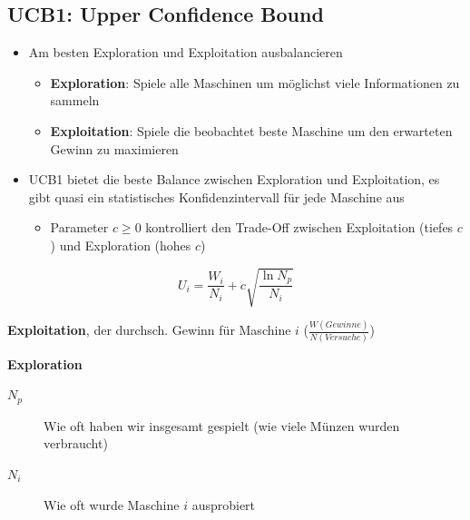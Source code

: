 \documentclass[a4paper]{article}
\begin{document}
		\subsection{UCB1: Upper Confidence Bound}
		
		\begin{itemize}
			\item Am besten Exploration und Exploitation ausbalancieren
				\begin{itemize}
					\item \textbf{Exploration}: Spiele alle Maschinen um möglichst viele Informationen zu sammeln
					\item \textbf{Exploitation}: Spiele die beobachtet beste Maschine um den erwarteten Gewinn zu maximieren
				\end{itemize}
			\item UCB1 bietet die beste Balance zwischen Exploration und Exploitation, es gibt quasi ein statistisches Konfidenzintervall für jede Maschine aus
				\begin{itemize}
					\item Parameter $c \geq 0$ kontrolliert den Trade-Off zwischen Exploitation (tiefes $c$) und Exploration (hohes $c$)
				\end{itemize}
		\end{itemize}
	
		$$U_{i} = \frac{W_{i}}{N_{i}} + c \sqrt{\frac{\ln N_{p}}{N_{i}}}$$
		
		\vspace{1em}
		\begin{description}
			\item[$\frac{W_{i}}{N_{i}}$] \textbf{Exploitation}, der durchsch. Gewinn für Maschine $i$ ($\frac{W(Gewinne)}{N(Versuche)}$)
			\item
			\item[$\sqrt{\frac{\ln N_{p}}{N_{i}}}$] \textbf{Exploration}
				\begin{description}
					\item[$N_{p}$] Wie oft haben wir insgesamt gespielt (wie viele Münzen wurden verbraucht)
					\item[$N_{i}$] Wie oft wurde Maschine $i$ ausprobiert
				\end{description}
		\end{description}
		
		\newpage
		
\end{document}

